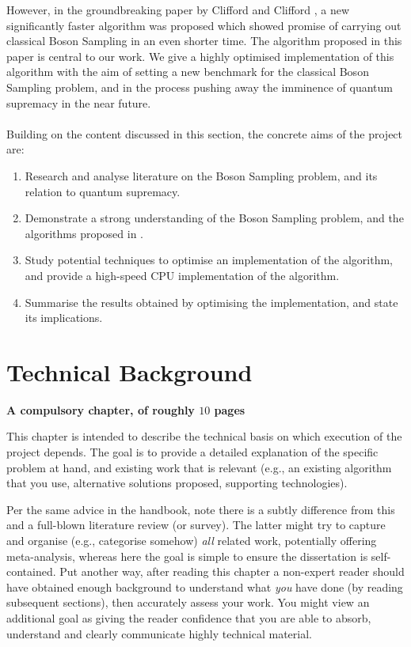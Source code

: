 \documentclass[ %
                    author={Manan Vaswani},
                supervisor={Dr. Raphael Clifford},
                    degree={MEng},
                     title={A multi-core CPU implementation \n of the classical Boson Sampling algorithm},
                  subtitle={},
                      type={},
                      year={2019} ]{dissertation}
\begin{document}
However, in the groundbreaking paper by Clifford and Clifford \cite{clifford17}, a new significantly faster algorithm was proposed which showed promise of carrying out classical Boson Sampling in an even shorter time. The algorithm proposed in this paper is central to our work. We give a highly optimised implementation of this algorithm with the aim of setting a new benchmark for the classical Boson Sampling problem, and in the process pushing away the imminence of quantum supremacy in the near future.
\\
\\
\noindent
Building on the content discussed in this section, the concrete aims of the project are:
\begin{enumerate}
\item Research and analyse literature on the Boson Sampling problem, and its relation to quantum supremacy.
\item Demonstrate a strong understanding of the Boson Sampling problem, and the algorithms proposed in \cite{clifford17}.
\item Study potential techniques to optimise an implementation of the algorithm, and provide a high-speed CPU implementation of the algorithm.
\item Summarise the results obtained by optimising the implementation, and state its implications.
\end{enumerate}


\chapter{Technical Background}
\label{chap:technical}

{\bf A compulsory chapter,     of roughly $10$ pages} 
\vspace{1cm} 

\noindent
This chapter is intended to describe the technical basis on which execution
of the project depends.  The goal is to provide a detailed explanation of
the specific problem at hand, and existing work that is relevant (e.g., an
existing algorithm that you use, alternative solutions proposed, supporting
technologies).  

Per the same advice in the handbook, note there is a subtly difference from
this and a full-blown literature review (or survey).  The latter might try
to capture and organise (e.g., categorise somehow) {\em all} related work,
potentially offering meta-analysis, whereas here the goal is simple to
ensure the dissertation is self-contained.  Put another way, after reading 
this chapter a non-expert reader should have obtained enough background to 
understand what {\em you} have done (by reading subsequent sections), then 
accurately assess your work.  You might view an additional goal as giving 
the reader confidence that you are able to absorb, understand and clearly 
communicate highly technical material.
\end{document}
